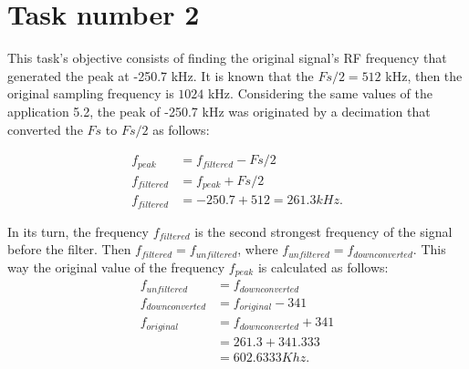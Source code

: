 \documentclass[
	12pt,				%
	openright,			%
	oneside,			%
	a4paper,			%
	chapter=TITLE,		%
	english,			%
	french,				%
	spanish,			%
	brazil				%
	]{abntex2}
\theoremstyle{definition}
\begin{document}

\frenchspacing 


\imprimircapa



\textual

\chapter{Task number 2}
\label{cap:introducao}
This task's objective consists of finding the original signal's RF frequency that generated the peak at -250.7 kHz. It is known that the $Fs/2 = 512$ kHz, then the original sampling frequency is $1024$ kHz. Considering the same values of the application 5.2, the peak of -250.7 kHz was originated by a decimation that converted the $Fs$ to $Fs/2$ as follows:

\begin{align}
	f_{peak} &= f_{filtered} - Fs/2 \\ \nonumber
	f_{filtered} &= f_{peak} + Fs/2 \\ \nonumber
	f_{filtered} &= -250.7 + 512 = 261.3 kHz.
\end{align}

In its turn, the frequency $f_{filtered}$ is the second strongest frequency of the signal before the filter. Then $f_{filtered} = f_{unfiltered}$, where $f_{unfiltered} = f_{downconverted}$. This way the original value of the frequency $f_{peak}$  is calculated as follows:
\begin{align}
	f_{unfiltered} &= f_{downconverted} \\ \nonumber
	f_{downconverted} &= f_{original} - 341 \\ \nonumber
	f_{original} &= f_{downconverted} + 341\\ \nonumber
				 &= 261.3 + 341.333\\ \nonumber
				 &= 602.6333 Khz.
\end{align}
\end{document}

